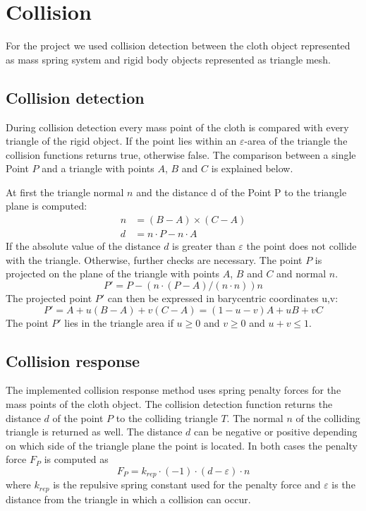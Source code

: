 \section{Collision}
For the project we used collision detection between the cloth object represented as mass spring system and rigid body objects represented as triangle mesh. 

\subsection{Collision detection}
During collision detection every mass point of the cloth is compared with every triangle of the rigid object. If the point lies within an $\varepsilon$-area of the triangle the collision functions returns true, otherwise false. The comparison between a single Point $P$ and a triangle with points $A$, $B$ and $C$ is explained below.\par

At first the triangle normal $n$ and the distance d of the Point P to the triangle plane is computed:
\begin{align}
	n &= (B-A) \times (C-A)\\
	d &= n \cdot P - n \cdot A
\end{align}
If the absolute value of the distance $d$ is greater than  $\varepsilon$ the point does not collide with the triangle.
Otherwise, further checks are necessary. The point $P$ is projected on the plane of the triangle with points $A$, $B$ and $C$ and normal $n$.
\begin{equation}
	P' = P - (n \cdot (P - A)/(n \cdot n))n
\end{equation}
The projected point $P'$ can then be expressed in barycentric coordinates u,v:
\begin{equation}
	P' = A + u(B - A) + v(C - A) = (1 - u - v)A + uB + vC
\end{equation}
The point $P'$ lies in the triangle area if $u\geq 0$ and $v\geq 0$ and $u+v \leq 1$.

\subsection{Collision response}
The implemented collision response method uses spring penalty forces  for the mass points of the cloth object. The collision detection function returns the distance $d$ of the point $P$ to the colliding triangle $T$. The normal $n$ of the colliding triangle is returned as well. The distance  $d$ can be negative or positive depending on which side of the triangle plane the point is located.  In both cases the penalty force $F_P$ is computed as
\begin{equation}
	F_P = k_{rep} \cdot (-1) \cdot (d - \varepsilon) \cdot n
\end{equation}
where $ k_{rep}$ is the repulsive spring constant used for the penalty force and  $\varepsilon$ is the distance from the triangle in which a collision can occur.
